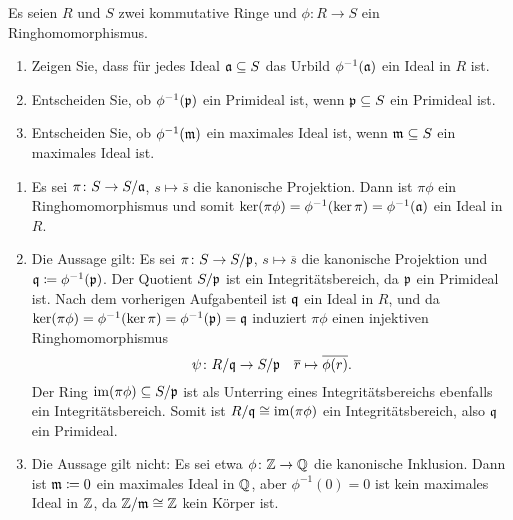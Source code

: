 \begin{question}[subtitle = Urbilder von Idealen]
  \label{question: preimages of ideals}
  Es seien $R$ und $S$ zwei kommutative Ringe und $\phi \colon R \to S$ ein Ringhomomorphismus.
  \begin{enumerate}
    \item
      Zeigen Sie, dass für jedes Ideal $\mathfrak{a} \subseteq S$ das Urbild $\phi^{-1}(\mathfrak{a})$ ein Ideal in $R$ ist.
    \item
      Entscheiden Sie, ob $\phi^{-1}(\mathfrak{p})$ ein Primideal ist, wenn $\mathfrak{p} \subseteq S$ ein Primideal ist.
    \item
      Entscheiden Sie, ob $\phi^{-1}(\mathfrak{m})$ ein maximales Ideal ist, wenn $\mathfrak{m} \subseteq S$ ein maximales Ideal ist.
  \end{enumerate}
\end{question}


\begin{solution}
  \begin{enumerate}
    \item
      Es sei $\pi \colon S \to S/\mathfrak{a}$, $s \mapsto \overline{s}$ die kanonische Projektion.
      Dann ist $\pi \phi$ ein Ringhomomorphismus und somit $\ker (\pi \phi) = \phi^{-1}(\ker \pi) = \phi^{-1}(\mathfrak{a})$ ein Ideal in $R$.
    \item
      Die Aussage gilt:
      Es sei $\pi \colon S \to S/\mathfrak{p}$, $s \mapsto \overline{s}$ die kanonische Projektion und $\mathfrak{q} \coloneqq \phi^{-1}(\mathfrak{p})$.
      Der Quotient $S/\mathfrak{p}$ ist ein Integritätsbereich, da $\mathfrak{p}$ ein Primideal ist.
      Nach dem vorherigen Aufgabenteil ist $\mathfrak{q}$ ein Ideal in $R$, und da $\ker (\pi \phi) = \phi^{-1}(\ker \pi) = \phi^{-1}(\mathfrak{p}) = \mathfrak{q}$ induziert $\pi \phi$ einen injektiven Ringhomomorphismus
      \[
        \psi \colon R/\mathfrak{q} \to S/\mathfrak{p}
        \quad
        \overline{r} \mapsto \overline{\phi(r)}.
      \]
      Der Ring $\operatorname{im} (\pi \phi) \subseteq S/\mathfrak{p}$ ist als Unterring eines Integritätsbereichs ebenfalls ein Integritätsbereich.
      Somit ist $R/\mathfrak{q} \cong \operatorname{im}(\pi \phi)$ ein Integritätsbereich, also $\mathfrak{q}$ ein Primideal.
    \item
      Die Aussage gilt nicht:
      Es sei etwa $\phi \colon \mathbb{Z} \to \mathbb{Q}$ die kanonische Inklusion.
      Dann ist $\mathfrak{m} \coloneqq 0$ ein maximales Ideal in $\mathbb{Q}$, aber $\phi^{-1}(0) = 0$ ist kein maximales Ideal in $\mathbb{Z}$, da $\mathbb{Z}/\mathfrak{m} \cong \mathbb{Z}$ kein Körper ist.
  \end{enumerate}
\end{solution}


